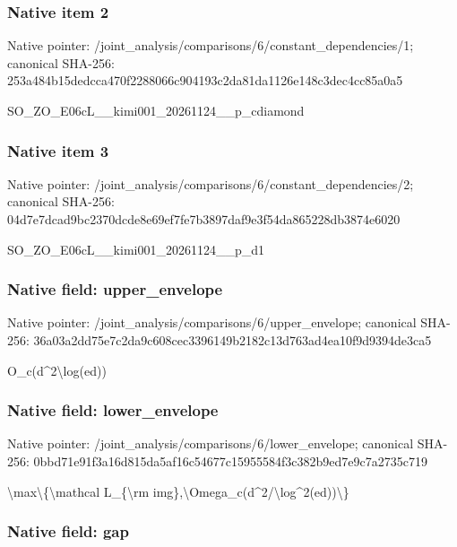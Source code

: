 \documentclass[10pt,a4paper]{article}
\begin{document}
\subsubsection{Native item 2}


Native pointer: /joint\_analysis/comparis\allowbreak{}ons/6/constant\_dependenc\allowbreak{}ies/1; canonical SHA-256: 253a484b15dedcca470f2288\allowbreak{}066c904193c2da81da1126e1\allowbreak{}48c3dec4cc85a0a5


SO\_ZO\_E06cL\_\_kimi001\_202\allowbreak{}61124\_\_p\_cdiamond


\subsubsection{Native item 3}


Native pointer: /joint\_analysis/comparis\allowbreak{}ons/6/constant\_dependenc\allowbreak{}ies/2; canonical SHA-256: 04d7e7dcad9bc2370dcde8e6\allowbreak{}9ef7fe7b3897daf9e3f54da8\allowbreak{}65228db3874e6020


SO\_ZO\_E06cL\_\_kimi001\_20261124\_\_p\_d1


\subsubsection{Native field: upper\_envelope}


Native pointer: /joint\_analysis/comparis\allowbreak{}ons/6/upper\_envelope; canonical SHA-256: 36a03a2dd75e7c2da9c608ce\allowbreak{}c3396149b2182c13d763ad4e\allowbreak{}a10f9d9394de3ca5


O\_c(d\textasciicircum{}2\textbackslash{}log(ed))


\subsubsection{Native field: lower\_envelope}


Native pointer: /joint\_analysis/comparis\allowbreak{}ons/6/lower\_envelope; canonical SHA-256: 0bbd71e91f3a16d815da5af1\allowbreak{}6c54677c15955584f3c382b9\allowbreak{}ed7e9c7a2735c719


\textbackslash{}max\textbackslash{}\{\textbackslash{}mathcal L\_\{\textbackslash{}rm img\},\textbackslash{}Omega\_c(d\textasciicircum{}2/\textbackslash{}log\textasciicircum{}2(ed))\textbackslash{}\}


\subsubsection{Native field: gap}
\end{document}
